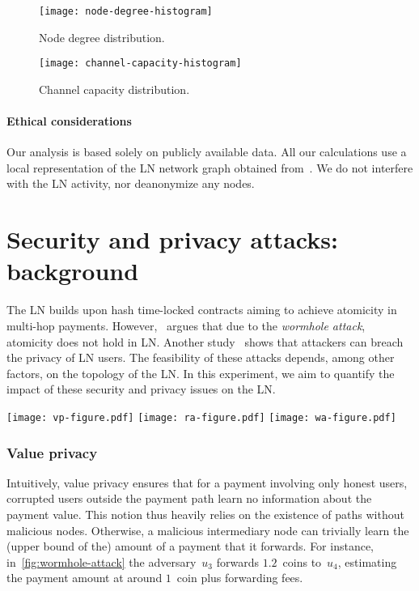 \begin{figure}[tb]
	\centering
	\texttt{[image: node-degree-histogram]}
	\caption{Node degree distribution.}
	\label{fig:node-degree-histogram}
\end{figure}

\begin{figure}[tb]
	\centering
	\texttt{[image: channel-capacity-histogram]}
	\caption{Channel capacity distribution.}
	\label{fig:channel-capacity-histogram}
\end{figure}

\paragraph{Ethical considerations} 
Our analysis is based solely on publicly available data.
All our calculations use a local representation of the LN network graph obtained from~\cite{fiatjaf2020}.
We do not interfere with the LN activity, nor deanonymize any nodes.


\section{Security and privacy attacks: background}
\label{sec:sec-priv-attacks}

The LN builds upon hash time-locked contracts aiming to achieve atomicity in multi-hop payments.
However,~\cite{Malavolta2019} argues that due to the \emph{wormhole attack}, atomicity does not hold in LN\@.
Another study~\cite{Malavolta2017} shows that attackers can breach the privacy of LN users.
The feasibility of these attacks depends, among other factors, on the topology of the LN\@.
In this experiment, we aim to quantify the impact of these security and privacy issues on the LN\@.

\begin{figure*}[tb]
	\texttt{[image: vp-figure.pdf]}
	\vspace{0.3cm}
	\texttt{[image: ra-figure.pdf]}
	\vspace{0.3cm}
	\texttt{[image: wa-figure.pdf]}
	\caption{An illustrative example of value privacy (top), relationship anonymity (middle), and the wormhole attack (bottom).}
	\label{fig:wormhole-attack}
\end{figure*}

\subsubsection*{Value privacy}
Intuitively, value privacy ensures that for a payment involving only honest users, corrupted users outside the payment path learn no information about the payment value.
This notion thus heavily relies on the existence of paths without malicious nodes.
Otherwise, a malicious intermediary node can trivially learn the (upper bound of the) amount of a payment that it forwards.
For instance, in~\cref{fig:wormhole-attack} the adversary~$u_3$ forwards $1.2$~coins to~$u_4$, estimating the payment amount at around $1$~coin plus forwarding fees.

